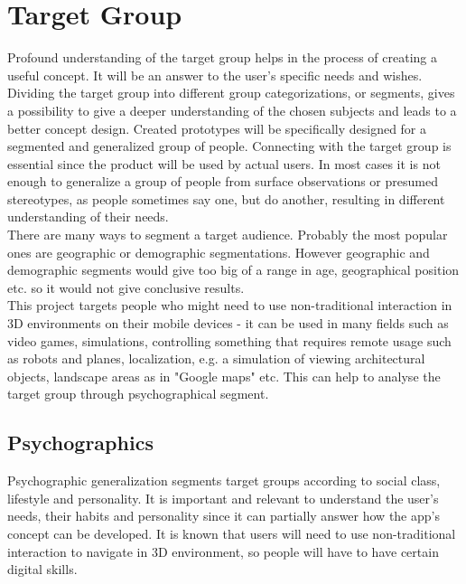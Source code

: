 \section{Target Group}
\label{TargetGroup}
Profound understanding of the target group helps in the process of creating a useful concept. It will be an answer to the user's specific needs and wishes. Dividing the target group into different group categorizations, or segments, gives a possibility to give a deeper understanding of the chosen subjects and leads to a better concept design. Created prototypes will be specifically designed for a segmented and generalized group of people. Connecting with the target group is essential since the product will be used by actual users. In most cases it is not enough to generalize a group of people from surface observations or presumed stereotypes, as people sometimes say one, but do another, resulting in different understanding of their needs.
\\
There are many ways to segment a target audience. Probably the most popular ones are geographic or demographic segmentations. However geographic and demographic segments would give too big of a range in age, geographical position etc. so it would not give conclusive results.
\\
This project targets people who might need to use non-traditional interaction in 3D environments on their mobile devices - it can be used in many fields such as video games, simulations, controlling something that requires remote usage such as robots and planes, localization, e.g. a simulation of viewing architectural objects, landscape areas as in "Google maps" etc. This can help to analyse the target group through psychographical segment. 
\\
\subsection{Psychographics}
Psychographic generalization segments target groups according to social class, lifestyle and personality. \cite{Psychographic} It is important and relevant to understand the user's needs, their habits and personality since it can partially answer how the app's concept can be developed. It is known that users will need to use non-traditional interaction to navigate in 3D environment, so people will have to have certain digital skills. 
\\
